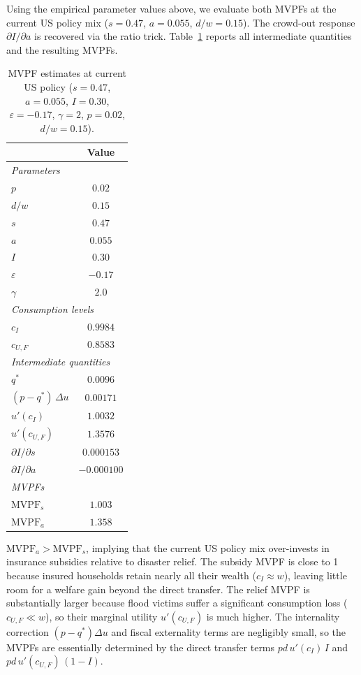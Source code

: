 \documentclass[12pt]{article}
\begin{document}
Using the empirical parameter values above, we evaluate both MVPFs at the current US policy mix ($s = 0.47$, $a = 0.055$, $d/w = 0.15$).
The crowd-out response $\partial I/\partial a$ is recovered via the ratio trick.
Table~\ref{tab:mvpf} reports all intermediate quantities and the resulting MVPFs.

\begin{table}[h]
\centering
\renewcommand{\arraystretch}{1.4}
\begin{tabular}{lc}
\toprule
& \textbf{Value} \\
\midrule
\multicolumn{2}{l}{\textit{Parameters}} \\
$p$           & $0.02$ \\
$d/w$         & $0.15$ \\
$s$           & $0.47$ \\
$a$           & $0.055$ \\
$I$           & $0.30$ \\
$\varepsilon$ & $-0.17$ \\
$\gamma$      & $2.0$ \\
\midrule
\multicolumn{2}{l}{\textit{Consumption levels}} \\
$c_I$     & $0.9984$ \\
$c_{U,F}$ & $0.8583$ \\
\midrule
\multicolumn{2}{l}{\textit{Intermediate quantities}} \\
$q^*$                         & $0.0096$ \\
$(p - q^*)\,\Delta u$         & $0.00171$ \\
$u'(c_I)$                     & $1.0032$ \\
$u'(c_{U,F})$                 & $1.3576$ \\
$\partial I/\partial s$       & $0.000153$ \\
$\partial I/\partial a$       & $-0.000100$ \\
\midrule
\multicolumn{2}{l}{\textit{MVPFs}} \\
$\mathrm{MVPF}_s$ & $\mathbf{1.003}$ \\
$\mathrm{MVPF}_a$ & $\mathbf{1.358}$ \\
\bottomrule
\end{tabular}
\caption{MVPF estimates at current US policy ($s = 0.47$, $a = 0.055$, $I = 0.30$, $\varepsilon = -0.17$, $\gamma = 2$, $p = 0.02$, $d/w = 0.15$).}
\label{tab:mvpf}
\end{table}

$\mathrm{MVPF}_a > \mathrm{MVPF}_s$, implying that the current US policy mix over-invests in insurance subsidies relative to disaster relief.
The subsidy MVPF is close to 1 because insured households retain nearly all their wealth ($c_I \approx w$), leaving little room for a welfare gain beyond the direct transfer.
The relief MVPF is substantially larger because flood victims suffer a significant consumption loss ($c_{U,F} \ll w$), so their marginal utility $u'(c_{U,F})$ is much higher.
The internality correction $(p - q^*)\Delta u$ and fiscal externality terms are negligibly small, so the MVPFs are essentially determined by the direct transfer terms $pd\,u'(c_I)\,I$ and $pd\,u'(c_{U,F})\,(1-I)$.
\end{document}
